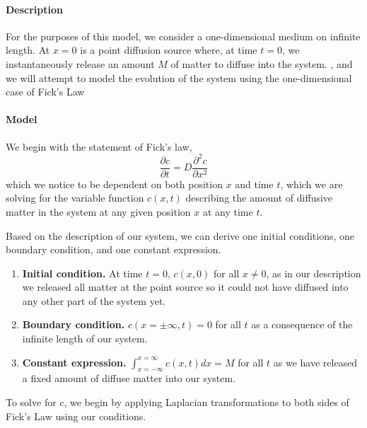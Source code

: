 

\paragraph{Description}
For the purposes of this model, we consider a one-dimensional medium on infinite length. At $x=0$ is a point diffusion source where, at time $t=0$, we instantaneously release an amount $M$ of matter to diffuse into the system. , and we will attempt to model the evolution of the system using the one-dimensional case of Fick's Law
    
\paragraph{Model}
We begin with the statement of Fick's law,
$$\frac{\partial c}{\partial t} = D \frac{\partial^2 c}{\partial x^2}$$
which we notice to be dependent on both position $x$ and time $t$, which we are solving for the variable function $c(x,t)$ describing the amount of diffusive matter in the system at any given position $x$ at any time $t$.

Based on the description of our system, we can derive one initial conditions, one boundary condition, and one constant expression.

\begin{enumerate}
    \item {\bf Initial condition.} At time $t=0$, $c(x,0)$ for all $x \neq 0$, as in our description we released all matter at the point source so it could not have diffused into any other part of the system yet.
    \item {\bf Boundary condition.} $c(x=\pm \infty,t) = 0$ for all $t$ as a consequence of the infinite length of our system.
    \item {\bf Constant expression.} $\int_{x=-\infty}^{x=\infty}c(x,t) dx= M$ for all $t$ as we have released a fixed amount of diffuse matter into our system. 
\end{enumerate}

To solve for $c$, we begin by applying Laplacian transformations to both sides of Fick's Law using our conditions.

